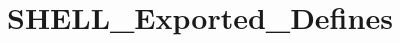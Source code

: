 \hypertarget{group___s_h_e_l_l___exported___defines}{}\section{S\+H\+E\+L\+L\+\_\+\+Exported\+\_\+\+Defines}
\label{group___s_h_e_l_l___exported___defines}
